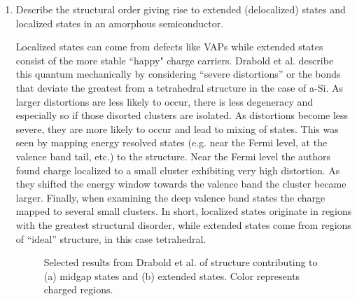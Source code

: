 \documentclass[12pt]{elsarticle}
\newcommand{\vs}{\vspace{2mm}}
\newcommand{\fullline}{\noindent\rule{14cm}{0.4pt} \vspace{4mm}}
\begin{document}
\begin{enumerate}
\fullline
\item Describe the structural order giving rise to extended (delocalized) states and localized states in an amorphous semiconductor. \par \vs 

Localized states can come from defects like VAPs while extended states consist of the more stable ``happy" charge carriers. Drabold et al. \cite{Drabold2000} describe this quantum mechanically by considering ``severe distortions'' or the bonds that deviate the greatest from a tetrahedral structure in the case of a-Si. As larger distortions are less likely to occur, there is less degeneracy and especially so if those disorted clusters are isolated. As distortions become less severe, they are more likely to occur and lead to mixing of states. This was seen by mapping energy resolved states (e.g. near the Fermi level, at the valence band tail, etc.) to the structure. Near the Fermi level the authors found charge localized to a small cluster exhibiting very high distortion. As they shifted the energy window towards the valence band the cluster became larger. Finally, when examining the deep valence band states the charge mapped to several small clusters. In short, localized states originate in regions with the greatest structural disorder, while extended states come from regions of ``ideal'' structure, in this case tetrahedral.
\begin{figure}
	\hfill
	\hfill
	\hfill
	\caption{Selected results from Drabold et al. \cite{Drabold2000} of structure contributing to (a) midgap states and (b) extended states. Color represents charged regions.}
\end{figure}


\end{enumerate}
\end{document}
